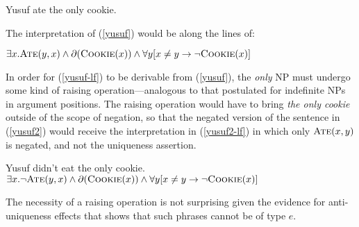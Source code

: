 \begin{exe}
	\ex \label{yusuf} Yusuf ate the only cookie.
\end{exe}

The interpretation of (\ref{yusuf}) would be along the lines of:

\begin{exe}
	\ex \label{yusuf-lf} $\exists x . \textsc{Ate}(y, x) \land \partial(\textsc{Cookie}(x)) \land \forall y [ x \ne y \to \neg \textsc{Cookie}(x) ]$
\end{exe}

In order for (\ref{yusuf-lf}) to be derivable from (\ref{yusuf}), the \textit{only} NP must undergo some kind of raising operation---analogous to that postulated for indefinite NPs in argument positions. The raising operation would have to bring \textit{the only cookie} outside of the scope of negation, so that the negated version of the sentence in (\ref{yusuf2}) would receive the interpretation in (\ref{yusuf2-lf}) in which only $\textsc{Ate}(x, y)$ is negated, and not the uniqueness assertion.

\begin{exe}
	\ex \label{yusuf2} Yusuf didn't eat the only cookie.
	\ex \label{yusuf2-lf} $\exists x . \neg\textsc{Ate}(y, x) \land \partial(\textsc{Cookie}(x)) \land \forall y [ x \ne y \to \neg \textsc{Cookie}(x) ]$
\end{exe}

The necessity of a raising operation is not surprising given the evidence for anti-uniqueness effects that shows that such phrases cannot be of type $e$.